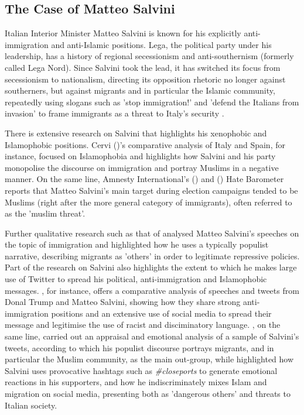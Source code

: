 \documentclass[11pt]{article}
\begin{document}
\subsection{The Case of Matteo Salvini}
 
Italian Interior Minister Matteo Salvini is known for his explicitly anti-immigration and anti-Islamic positions. Lega, the political party under his leadership, has a history of regional secessionism and anti-southernism (formerly called Lega Nord). Since Salvini took the lead, it has switched its focus from secessionism to nationalism, directing its opposition rhetoric no longer against southerners, but against migrants and in particular the Islamic community, repeatedly using slogans such as 'stop immigration!' and 'defend the Italians from invasion' to frame immigrants as a threat to Italy's security \citep{cervi2020exclusionary}. 

There is extensive research on Salvini that highlights his xenophobic and Islamophobic positions. Cervi (\citeyear{cervi2020exclusionary})’s comparative analysis of Italy
and Spain, for instance, focused on Islamophobia and highlights how Salvini and his party monopolise the discourse on immigration and portray Muslims in a negative manner. On the same line, Amnesty International's (\citeyear{amnesty2018}) and (\citeyear{amnesty2019}) Hate Barometer reports that Matteo Salvini's main target during election campaigns tended to be Muslims (right after the more general category of immigrants), often referred to as the 'muslim threat'.

Further qualitative research such as that of \citet{cervi2020populists} analysed Matteo Salvini's speeches on the topic of immigration and highlighted how he uses a typically populist narrative, describing migrants as 'others' in order to legitimate repressive policies. Part of the research on Salvini also highlights the extent to which he makes large use of Twitter to spread his political, anti-immigration and Islamophobic messages. \citet{lorenzetti2020anti}, for instance, offers a comparative analysis of speeches and tweets from Donal Trump and Matteo Salvini, showing how they share strong anti-immigration positions and an extensive use of social media to spread their message and legitimise the use of racist and disciminatory language. \citet{reggi20237}, on the same line, carried out an appraisal and emotional analysis of a sample of Salvini’s tweets, according to which his populist discourse portrays migrants, and in particular the Muslim community, as the main out-group, while \citet{evolvi2019emotional} highlighted how Salvini uses provocative hashtags such as \textit{\#closeports} to generate emotional reactions in his supporters, and how he indiscriminately mixes Islam and migration on social media, presenting both as 'dangerous others' and threats to
Italian society.
\end{document}
